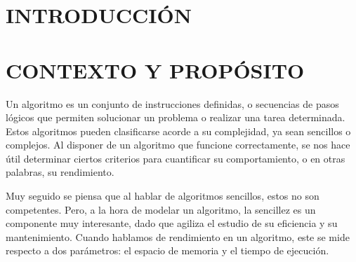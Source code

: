\documentclass[11pt, twocolumn]{llncs}
\begin{document}

\section{INTRODUCCIÓN}


\section{CONTEXTO Y PROPÓSITO}\label{contexto_proposito}

Un algoritmo es un conjunto de instrucciones definidas, o secuencias de pasos lógicos que permiten solucionar un problema o realizar una tarea determinada. Estos algoritmos pueden clasificarse acorde a su complejidad, ya sean sencillos o complejos. Al disponer de un algoritmo que funcione correctamente, se nos hace útil determinar ciertos criterios para cuantificar su comportamiento, o en otras palabras, su rendimiento.

Muy seguido se piensa que al hablar de algoritmos sencillos, estos no son competentes. Pero, a la hora de modelar un algoritmo, la sencillez es un componente muy interesante, dado que agiliza el estudio de su eficiencia y su mantenimiento. Cuando hablamos de rendimiento en un algoritmo, este se mide respecto a dos parámetros: el espacio de memoria y el tiempo de ejecución.
\end{document}
